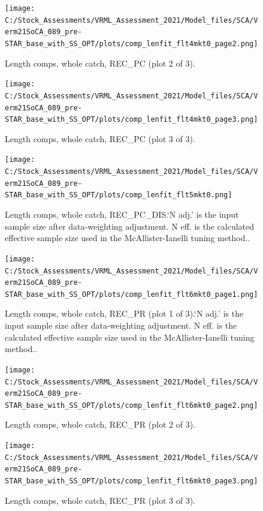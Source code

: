 \documentclass[
  english,
  a4paper,
]{article}
\begin{document}
\begin{figure}
\centering
\texttt{[image: C:/Stock\_Assessments/VRML\_Assessment\_2021/Model\_files/SCA/Verm21SoCA\_089\_pre-STAR\_base\_with\_SS\_OPT/plots/comp\_lenfit\_flt4mkt0\_page2.png]}
\caption{Length comps, whole catch, REC\_PC (plot 2 of 3).\label{fig:comp_lenfit_flt4mkt0_page2}}
\end{figure}

\begin{figure}
\centering
\texttt{[image: C:/Stock\_Assessments/VRML\_Assessment\_2021/Model\_files/SCA/Verm21SoCA\_089\_pre-STAR\_base\_with\_SS\_OPT/plots/comp\_lenfit\_flt4mkt0\_page3.png]}
\caption{Length comps, whole catch, REC\_PC (plot 3 of 3).\label{fig:comp_lenfit_flt4mkt0_page3}}
\end{figure}

\begin{figure}
\centering
\texttt{[image: C:/Stock\_Assessments/VRML\_Assessment\_2021/Model\_files/SCA/Verm21SoCA\_089\_pre-STAR\_base\_with\_SS\_OPT/plots/comp\_lenfit\_flt5mkt0.png]}
\caption{Length comps, whole catch, REC\_PC\_DIS.`N adj.' is the input sample size after data-weighting adjustment. N eff. is the calculated effective sample size used in the McAllister-Ianelli tuning method..\label{fig:comp_lenfit_flt5mkt0}}
\end{figure}

\begin{figure}
\centering
\texttt{[image: C:/Stock\_Assessments/VRML\_Assessment\_2021/Model\_files/SCA/Verm21SoCA\_089\_pre-STAR\_base\_with\_SS\_OPT/plots/comp\_lenfit\_flt6mkt0\_page1.png]}
\caption{Length comps, whole catch, REC\_PR (plot 1 of 3).`N adj.' is the input sample size after data-weighting adjustment. N eff. is the calculated effective sample size used in the McAllister-Ianelli tuning method..\label{fig:comp_lenfit_flt6mkt0_page1}}
\end{figure}

\begin{figure}
\centering
\texttt{[image: C:/Stock\_Assessments/VRML\_Assessment\_2021/Model\_files/SCA/Verm21SoCA\_089\_pre-STAR\_base\_with\_SS\_OPT/plots/comp\_lenfit\_flt6mkt0\_page2.png]}
\caption{Length comps, whole catch, REC\_PR (plot 2 of 3).\label{fig:comp_lenfit_flt6mkt0_page2}}
\end{figure}

\begin{figure}
\centering
\texttt{[image: C:/Stock\_Assessments/VRML\_Assessment\_2021/Model\_files/SCA/Verm21SoCA\_089\_pre-STAR\_base\_with\_SS\_OPT/plots/comp\_lenfit\_flt6mkt0\_page3.png]}
\caption{Length comps, whole catch, REC\_PR (plot 3 of 3).\label{fig:comp_lenfit_flt6mkt0_page3}}
\end{figure}
\end{document}
